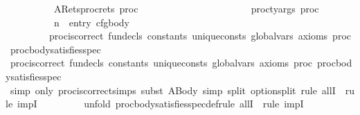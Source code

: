 \begin{isabellebody}
\ \ \ \ \ \ \ \ \ \ ARets{\isacharcolon}{\kern0pt}{\isachardoublequoteopen}proc{\isacharunderscore}{\kern0pt}rets\ proc\ {\isacharequal}{\kern0pt}\ {\isacharbrackleft}{\kern0pt}{\isacharbrackright}{\kern0pt}{\isachardoublequoteclose}\ \isanewline
\ \ \ \ \ \ \ \ \ \isanewline
\ \ \ \ \ \ \ \ \ \ {\isachardoublequoteopen}proc{\isacharunderscore}{\kern0pt}ty{\isacharunderscore}{\kern0pt}args\ proc\ {\isacharequal}{\kern0pt}\ {}{\isachardoublequoteclose}\ \isanewline
\ \ \ \ \ \ \ \ \ \ {\isachardoublequoteopen}n\ {\isacharequal}{\kern0pt}\ entry\ cfg{\isacharunderscore}{\kern0pt}body{\isachardoublequoteclose}\isanewline
\ \ \ \ \ \ \ \ \ \ \isanewline
\ \ \ \ \ \ \ \ \ {\isachardoublequoteopen}proc{\isacharunderscore}{\kern0pt}is{\isacharunderscore}{\kern0pt}correct\ fun{\isacharunderscore}{\kern0pt}decls\ constants\ unique{\isacharunderscore}{\kern0pt}consts\ global{\isacharunderscore}{\kern0pt}vars\ axioms\ proc\ proc{\isacharunderscore}{\kern0pt}body{\isacharunderscore}{\kern0pt}satisfies{\isacharunderscore}{\kern0pt}spec{\isachardoublequoteclose}\isanewline
%
\isadelimproof
%
\endisadelimproof
%
\isatagproof
{}\isamarkupfalse%
\ {\isacharminus}{\kern0pt}\isanewline
\ \ \isamarkupfalse%
\ {\isachardoublequoteopen}proc{\isacharunderscore}{\kern0pt}is{\isacharunderscore}{\kern0pt}correct\ fun{\isacharunderscore}{\kern0pt}decls\ constants\ unique{\isacharunderscore}{\kern0pt}consts\ global{\isacharunderscore}{\kern0pt}vars\ axioms\ proc\ proc{\isacharunderscore}{\kern0pt}body{\isacharunderscore}{\kern0pt}satisfies{\isacharunderscore}{\kern0pt}spec{\isachardoublequoteclose}\isanewline
\ \ \isamarkupfalse%
{\isacharparenleft}{\kern0pt}\ {\isacharparenleft}{\kern0pt}simp\ only{\isacharcolon}{\kern0pt}\ proc{\isacharunderscore}{\kern0pt}is{\isacharunderscore}{\kern0pt}correct{\isachardot}{\kern0pt}simps{\isacharparenright}{\kern0pt}{\isacharcomma}{\kern0pt}\ subst\ ABody{\isacharcomma}{\kern0pt}\ simp\ split{\isacharcolon}{\kern0pt}\ option{\isachardot}{\kern0pt}split{\isacharcomma}{\kern0pt}\ {\isacharparenleft}{\kern0pt}rule\ allI\ {\isacharbar}{\kern0pt}\ rule\ impI{\isacharparenright}{\kern0pt}{\isacharplus}{\kern0pt}{\isacharcomma}{\kern0pt}\isanewline
\ \ \ \ \ \ \ \ \ unfold\ proc{\isacharunderscore}{\kern0pt}body{\isacharunderscore}{\kern0pt}satisfies{\isacharunderscore}{\kern0pt}spec{\isacharunderscore}{\kern0pt}def{\isacharcomma}{\kern0pt}{\isacharparenleft}{\kern0pt}rule\ allI\ {\isacharbar}{\kern0pt}\ rule\ impI{\isacharparenright}{\kern0pt}{\isacharplus}{\kern0pt}{\isacharparenright}{\kern0pt}\ \ \isanewline

\end{isabellebody}
